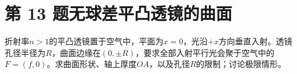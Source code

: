 \documentclass[UTF8,fontset=fandol,a4paper,11pt]{ctexart}
\begin{document}


\section*{第 13 题\quad 无球差平凸透镜的曲面}\label{q:13}

折射率$n>1$的平凸透镜置于空气中，平面为$x=0$，光沿$+x$方向垂直入射。透镜孔径半径为$R$，曲面边缘在$(0,\pm R)$，要求全部入射平行光会聚于空气中的$F=(f,0)$。求曲面形状、轴上厚度$OA$，以及孔径$R$的限制；讨论极限情形。

\begin{center}\begin{minipage}{.98\linewidth}\centering
\begin{tikzpicture}[x=6cm,y=4.2cm,font=\small]

\end{tikzpicture}
\end{minipage}
\end{center}
\end{document}
